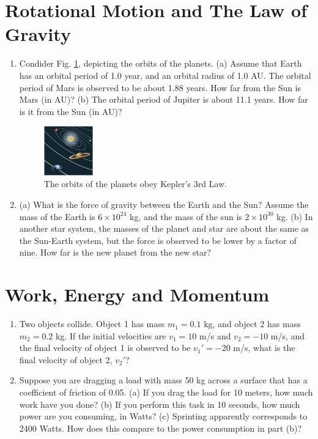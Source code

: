 \documentclass[10pt]{article}
\begin{document}
\section{Rotational Motion and The Law of Gravity}
\begin{enumerate}
\item Condider Fig. \ref{fig:orbits}, depicting the orbits of the planets.  (a) Assume that Earth has an orbital period of 1.0 year, and an orbital radius of 1.0 AU.  The orbital period of Mars is observed to be about 1.88 years.  How far from the Sun is Mars (in AU)? (b) The orbital period of Jupiter is about 11.1 years.  How far is it from the Sun (in AU)? \\ \vspace{1.5 cm}
\begin{figure}[hb]
\centering
\includegraphics[width=0.2\textwidth]{figures/orbits.png}
\caption{\label{fig:orbits} The orbits of the planets obey Kepler's 3rd Law.}
\end{figure}
\item (a) What is the force of gravity between the Earth and the Sun?  Assume the mass of the Earth is $6\times 10^{24}$ kg, and the mass of the sun is $2\times 10^{30}$ kg. (b) In another star system, the masses of the planet and star are about the same as the Sun-Earth system, but the force is observed to be lower by a factor of nine. How far is the new planet from the new star? \\ \vspace{1.5cm}
\end{enumerate}
\section{Work, Energy and Momentum}
\begin{enumerate}
\item Two objects collide. Object 1 has mass $m_1 = 0.1$ kg, and object 2 has mass $m_2 = 0.2$ kg.  If the initial velocities are $v_1 = 10$ m/s and $v_2 = -10$ m/s, and the final velocity of object 1 is observed to be $v_1' = -20$ m/s, what is the final velocity of object 2, $v_2'$? \\ \vspace{2cm}
\item Suppose you are dragging a load with mass 50 kg across a surface that has a coefficient of friction of 0.05.  (a) If you drag the load for 10 meters, how much work have you done? (b) If you perform this task in 10 seconds, how much power are you consuming, in Watts?  (c) Sprinting apparently corresponds to 2400 Watts.  How does this compare to the power consumption in part (b)? \\ \vspace{2cm}
\end{enumerate}
\end{document}
